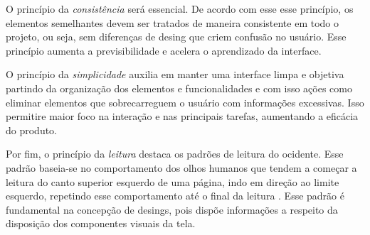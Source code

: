 O princípio da \textit{consistência} será essencial. De acordo com esse esse princípio, os elementos semelhantes devem ser tratados de maneira consistente em todo o projeto, ou seja, sem diferenças de desing que criem confusão no usuário. Esse princípio aumenta a previsibilidade e acelera o aprendizado da interface.

O princípio da \textit{simplicidade} auxilia em manter uma interface limpa e objetiva partindo da organização dos elementos e funcionalidades e com isso ações como eliminar elementos que sobrecarreguem o usuário com informações excessivas. Isso permitire maior foco na interação e nas principais tarefas, aumentando a eficácia do produto.

Por fim, o princípio da \textit{leitura} destaca os padrões de leitura do ocidente. Esse padrão baseia-se no comportamento dos olhos humanos que tendem a começar a leitura do canto superior esquerdo de uma página, indo em direção ao limite esquerdo, repetindo esse comportamento até o final da leitura \cite{lidwell2010}. Esse padrão é fundamental na concepção de desings, pois dispõe informações a respeito da disposição dos componentes visuais da tela.